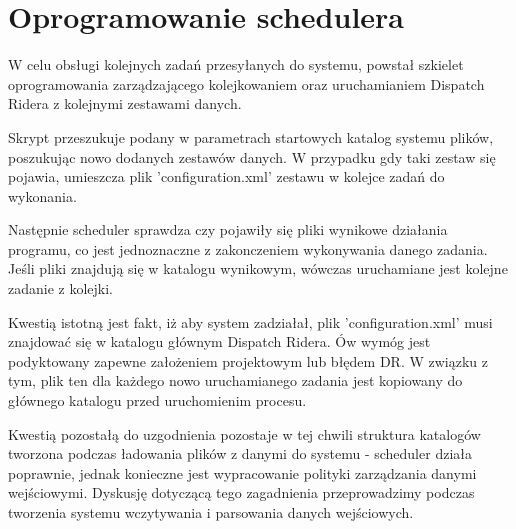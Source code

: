 \chapter{Oprogramowanie schedulera}
W celu obsługi kolejnych zadań przesyłanych do systemu, powstał szkielet oprogramowania zarządzającego kolejkowaniem oraz uruchamianiem Dispatch Ridera z kolejnymi zestawami danych.


Skrypt przeszukuje podany w parametrach startowych katalog systemu plików, poszukując nowo dodanych zestawów danych. W przypadku gdy taki zestaw się pojawia, umieszcza plik 'configuration.xml' zestawu w kolejce zadań do wykonania.


Następnie scheduler sprawdza czy pojawiły się pliki wynikowe działania programu, co jest jednoznaczne z zakonczeniem wykonywania danego zadania. Jeśli pliki znajdują się w katalogu wynikowym, wówczas uruchamiane jest kolejne zadanie z kolejki. 


Kwestią istotną jest fakt, iż aby system zadziałał, plik 'configuration.xml' musi znajdować się w katalogu głównym Dispatch Ridera. Ów wymóg jest podyktowany zapewne założeniem projektowym lub błędem DR. W związku z tym, plik ten dla każdego nowo uruchamianego zadania jest kopiowany do głównego katalogu przed uruchomienim procesu. 


Kwestią pozostałą do uzgodnienia pozostaje w tej chwili struktura katalogów tworzona podczas ładowania plików z danymi do systemu - scheduler działa poprawnie, jednak konieczne jest wypracowanie polityki zarządzania danymi wejściowymi. Dyskusję dotyczącą tego zagadnienia przeprowadzimy podczas tworzenia systemu wczytywania i parsowania danych wejściowych.